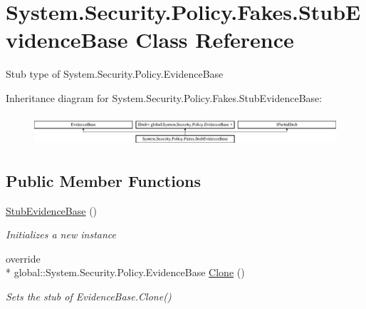 \hypertarget{class_system_1_1_security_1_1_policy_1_1_fakes_1_1_stub_evidence_base}{\section{System.\-Security.\-Policy.\-Fakes.\-Stub\-Evidence\-Base Class Reference}
\label{class_system_1_1_security_1_1_policy_1_1_fakes_1_1_stub_evidence_base}
}


Stub type of System.\-Security.\-Policy.\-Evidence\-Base 


Inheritance diagram for System.\-Security.\-Policy.\-Fakes.\-Stub\-Evidence\-Base\-:\begin{figure}[H]
\begin{center}
\leavevmode
\includegraphics[height=1.148718cm]{class_system_1_1_security_1_1_policy_1_1_fakes_1_1_stub_evidence_base}
\end{center}
\end{figure}
\subsection*{Public Member Functions}
\begin{DoxyCompactItemize}
\item 
\hyperlink{class_system_1_1_security_1_1_policy_1_1_fakes_1_1_stub_evidence_base_a2dfc6e576001778504938462431efd98}{Stub\-Evidence\-Base} ()
\begin{DoxyCompactList}\small\item\em Initializes a new instance\end{DoxyCompactList}\item 
override \\*
global\-::\-System.\-Security.\-Policy.\-Evidence\-Base \hyperlink{class_system_1_1_security_1_1_policy_1_1_fakes_1_1_stub_evidence_base_a2aeb021be871d134d0109146eedf1be8}{Clone} ()
\begin{DoxyCompactList}\small\item\em Sets the stub of Evidence\-Base.\-Clone()\end{DoxyCompactList}\end{DoxyCompactItemize}
